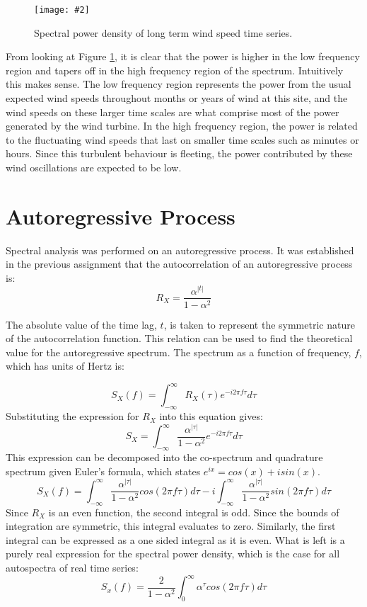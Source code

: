 \documentclass[11pt]{article}
\newcommand{\myFigure}[4][0.8]{
\begin{figure}[H] 

	\centering
	\setlength\fboxsep{1pt}
	\setlength\fboxrule{0.5pt}
	\texttt{[image: \#2]}
	\caption{\small #3}
	\label{#4}
\end{figure}
}
\begin{document}
\myFigure{Figures/figSpec2}{Spectral power density of long term wind speed time series.}{fig:spec2}
From looking at Figure \ref{fig:spec2}, it is clear that the power is higher in the low frequency region and tapers off in the high frequency region of the spectrum. Intuitively this makes sense. The low frequency region represents the power from the usual expected wind speeds throughout months or years of wind at this site, and the wind speeds on these larger time scales are what comprise most of the power generated by the wind turbine. In the high frequency region, the power is related to the fluctuating wind speeds that last on smaller time scales such as minutes or hours. Since this turbulent behaviour is fleeting, the power contributed by these wind oscillations are expected to be low.  

\section{Autoregressive Process}
Spectral analysis was performed on an autoregressive process. It was established in the previous assignment that the autocorrelation of an autoregressive process is:
$$R_X = \frac{\alpha^{|t|}}{1-\alpha^2}$$

The absolute value of the time lag, $t$, is taken to represent the symmetric nature of the autocorrelation function. This relation can be used to find the theoretical value for the autoregressive spectrum. The spectrum as a function of frequency, $f$, which has units of Hertz is:

$$S_X(f) = \int_{-\infty}^\infty R_X(\tau)e^{-i2\pi f\tau}d\tau$$
Substituting the expression for $R_X$ into this equation gives:
$$S_X = \int_{-\infty}^\infty \frac{\alpha^{|\tau|}}{1-\alpha^2}e^{-i2\pi f\tau}d\tau$$
This expression can be decomposed into the co-spectrum and quadrature spectrum given Euler's formula, which states $e^{ix} = cos(x) + isin(x)$.
$$S_X(f) = \int_{-\infty}^\infty \frac{\alpha^{|\tau|}}{1-\alpha^2}cos(2\pi f \tau )d\tau - i\int_{-\infty}^\infty \frac{\alpha^{|\tau|}}{1-\alpha^2}sin(2\pi f \tau )d\tau$$
Since $R_X$ is an even function, the second integral is odd. Since the bounds of integration are symmetric, this integral evaluates to zero. Similarly, the first integral can be expressed as a one sided integral as it is even. What is left is a purely real expression for the spectral power density, which is the case for all autospectra of real time series:
$$S_x(f) =\frac{2}{1-\alpha^2}\int_{0}^\infty \alpha^{\tau}cos(2\pi f \tau )d\tau$$
\end{document}
